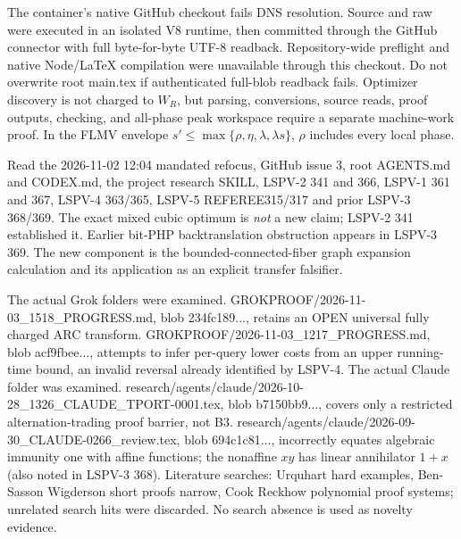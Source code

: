 \documentclass[11pt]{article}
\begin{document}
The container's native GitHub checkout fails DNS resolution. Source and raw were executed in an isolated V8 runtime, then committed through the GitHub connector with full byte-for-byte UTF-8 readback. Repository-wide preflight and native Node/LaTeX compilation were unavailable through this checkout. Do not overwrite root main.tex if authenticated full-blob readback fails. Optimizer discovery is not charged to $W_R$, but parsing, conversions, source reads, proof outputs, checking, and all-phase peak workspace require a separate machine-work proof. In the FLMV envelope $s'\le\max\{\rho,\eta,\lambda,\lambda s\}$, $\rho$ includes every local phase.

Read the 2026-11-02 12:04 mandated refocus, GitHub issue 3, root AGENTS.md and CODEX.md, the project research SKILL, LSPV-2 341 and 366, LSPV-1 361 and 367, LSPV-4 363/365, LSPV-5 REFEREE315/317 and prior LSPV-3 368/369. The exact mixed cubic optimum is \emph{not} a new claim; LSPV-2 341 established it. Earlier bit-PHP backtranslation obstruction appears in LSPV-3 369. The new component is the bounded-connected-fiber graph expansion calculation and its application as an explicit transfer falsifier.

The actual Grok folders were examined. GROKPROOF/2026-11-03\_1518\_PROGRESS.md, blob 234fc189..., retains an OPEN universal fully charged ARC transform. GROKPROOF/2026-11-03\_1217\_PROGRESS.md, blob acf9fbee..., attempts to infer per-query lower costs from an upper running-time bound, an invalid reversal already identified by LSPV-4. The actual Claude folder was examined. research/agents/claude/2026-10-28\_1326\_CLAUDE\_TPORT-0001.tex, blob b7150bb9..., covers only a restricted alternation-trading proof barrier, not B3. research/agents/claude/2026-09-30\_CLAUDE-0266\_review.tex, blob 694c1c81..., incorrectly equates algebraic immunity one with affine functions; the nonaffine $xy$ has linear annihilator $1+x$ (also noted in LSPV-3 368). Literature searches: Urquhart hard examples, Ben-Sasson Wigderson short proofs narrow, Cook Reckhow polynomial proof systems; unrelated search hits were discarded. No search absence is used as novelty evidence.
\end{document}
